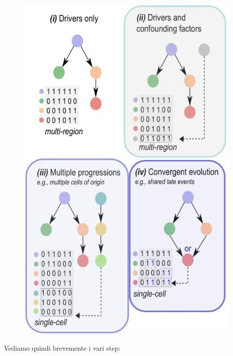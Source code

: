 \documentclass[a4paper,12pt, oneside]{book}
\begin{document}
\begin{figure}[H]
  \centering
  \includegraphics[scale = 0.3]{img/trait.jpg}
\end{figure}
Vediamo quindi brevemente i vari step:
\end{document}
